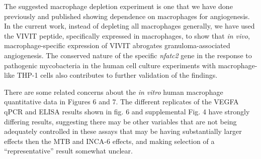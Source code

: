 \begin{description}[style=multiline, labelwidth=\widthof{Reviewer \#2:   }, font=\normalfont, leftmargin=\labelwidth, align=right]
\item \quad The suggested macrophage depletion experiment is one that we have done previously and published \citep{Oehlers2015} showing dependence on macrophages for angiogenesis. In the current work, instead of depleting all macrophages generally, we have used the VIVIT peptide, specifically expressed in macrophages, to show that \textit{in vivo}, macrophage\hyp{}specific expression of VIVIT abrogates granuloma\hyp{}associated angiogenesis. The conserved nature of the specific \textit{nfatc2} gene in the response to pathogenic mycobacteria in the human cell culture experiments with macrophage\hyp{}like THP\hyp{}1 cells also contributes to further validation of the findings.

\item[Reviewer \#2: ] \quad There are some related concerns about the \textit{in vitro} human macrophage quantitative data in Figures 6 and 7. The different replicates of the VEGFA qPCR and ELISA results shown in fig. 6 and supplemental Fig. 4 have strongly differing results, suggesting there may be other variables that are not being adequately controlled in these assays that may be having substantially larger effects then the MTB and INCA\hyp{}6 effects, and making selection of a “representative” result somewhat unclear. 


\end{description}
